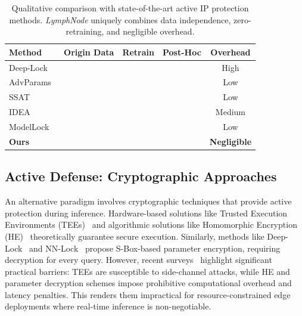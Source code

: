 \documentclass[conference]{IEEEtran}
\newcommand{\cmark}{\ding{51}}
\newcommand{\xmark}{\ding{55}}
\begin{document}
\begin{table}[!t]
    \centering
    \caption{Qualitative comparison with state-of-the-art active IP protection methods. \textit{LymphNode} uniquely combines data independence, zero-retraining, and negligible overhead.}
    \label{tab:sota_comparison}
    \small
    \setlength{\tabcolsep}{4pt} 
    \renewcommand{\arraystretch}{1.2}
    \begin{tabular}{lcccc}
        \toprule
        \textbf{Method} & \textbf{Origin Data} & \textbf{Retrain} & \textbf{Post-Hoc} & \textbf{Overhead} \\
        \midrule
        Deep-Lock~\cite{alam2020deeplock}    & \xmark & \xmark & \cmark & High   \\
        AdvParams~\cite{xue2021advparams}    & \cmark & \cmark & \xmark & Low    \\
        SSAT~\cite{xue2024ssat}              & \cmark & \cmark & \xmark & Low    \\
        IDEA~\cite{chakraborty2020hpnn}      & \cmark & \cmark & \xmark & Medium \\
        ModelLock~\cite{gong2024modellock}   & \cmark & \cmark & \xmark & Low    \\
        \midrule
        \textbf{Ours} & \textbf{\xmark} & \textbf{\xmark} & \textbf{\cmark} & \textbf{Negligible} \\
        \bottomrule
    \end{tabular}
\end{table}

\subsection{Active Defense: Cryptographic Approaches}
An alternative paradigm involves cryptographic techniques that provide active protection during inference. Hardware-based solutions like Trusted Execution Environments (TEEs)~\cite{tramer2019slalom} and algorithmic solutions like Homomorphic Encryption (HE)~\cite{natarajan2023chexmix} theoretically guarantee secure execution. Similarly, methods like Deep-Lock~\cite{alam2020deeplock} and NN-Lock~\cite{alam2022nnlock} propose S-Box-based parameter encryption, requiring decryption for every query. However, recent surveys~\cite{feng2024survey} highlight significant practical barriers: TEEs are susceptible to side-channel attacks, while HE and parameter decryption schemes impose prohibitive computational overhead and latency penalties. This renders them impractical for resource-constrained edge deployments where real-time inference is non-negotiable.
\end{document}
